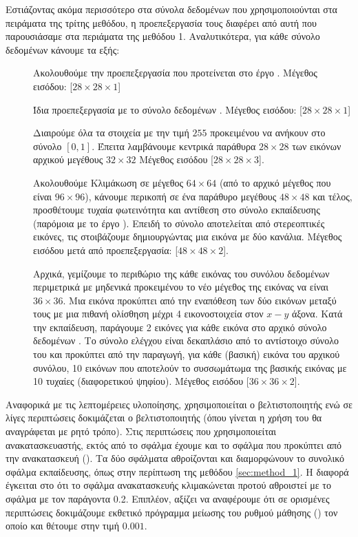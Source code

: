 Εστιάζοντας ακόμα περισσότερο στα σύνολα δεδομένων που χρησιμοποιούνται στα πειράματα της τρίτης μεθόδου, η προεπεξεργασία τους διαφέρει από αυτή που παρουσιάσαμε στα περιάματα της μεθόδου 1. Αναλυτικότερα, για κάθε σύνολο δεδομένων κάνουμε τα εξής:
\begin{description}
    \item[] Ακολουθούμε την προεπεξεργασία που προτείνεται στο έργο \cite{byerly2020branching}. Μέγεθος εισόδου: [$28 \times 28 \times 1$]
    \item[] Ίδια προεπεξεργασία με το σύνολο δεδομένων . Μέγεθος εισόδου: [$28 \times 28 \times 1$]
    \item[] Διαιρούμε όλα τα στοιχεία με την τιμή $255$ προκειμένου να ανήκουν στο σύνολο $[0,1]$. Έπειτα λαμβάνουμε κεντρικά παράθυρα $28 \times 28$ των εικόνων αρχικού μεγέθους $32 \times 32$ Μέγεθος εισόδου [$28 \times 28 \times 3$].
    \item[] Ακολουθούμε Κλιμάκωση σε μέγεθος $64 \times 64$ (από το αρχικό μέγεθος που είναι $96 \times 96$), κάνουμε περικοπή σε ένα παράθυρο μεγέθους $48 \times 48$ και τέλος, προσθέτουμε τυχαία φωτεινότητα και αντίθεση στο σύνολο εκπαίδευσης (παρόμοια με το έργο \cite{hinton2018matrix}). Επειδή το σύνολο αποτελείται από στερεοπτικές εικόνες, τις στοιβάζουμε δημιουργώντας μια εικόνα με δύο κανάλια. Μέγεθος εισόδου μετά από προεπεξεργασία: [$48 \times 48 \times 2$].
    \item[] Αρχικά, γεμίζουμε το περιθώριο της κάθε εικόνας του συνόλου δεδομένων  περιμετρικά με μηδενικά προκειμένου το νέο μέγεθος της εικόνας να είναι $36 \times 36$. Μια εικόνα  προκύπτει από την εναπόθεση των δύο εικόνων μεταξύ τους με μια πιθανή ολίσθηση μέχρι 4 εικονοστοιχεία στον $x-y$ άξονα. Κατά την εκπαίδευση, παράγουμε 2  εικόνες για κάθε εικόνα στο αρχικό σύνολο δεδομένων . Το σύνολο ελέγχου είναι δεκαπλάσιο από το αντίστοιχο σύνολο του  και προκύπτει από την παραγωγή, για κάθε (βασική) εικόνα του αρχικού συνόλου, 10 εικόνων που αποτελούν το συσσωμάτωμα της βασικής εικόνας με 10 τυχαίες (διαφορετικού ψηφίου). Μέγεθος εισόδου [$36 \times 36 \times 2$].
\end{description} 

Αναφορικά με τις λεπτομέρειες υλοποίησης, χρησιμοποιείται ο βελτιστοποιητής  ενώ σε λίγες περιπτώσεις δοκιμάζεται ο βελτιστοποιητής  (όπου γίνεται η χρήση του θα αναγράφεται με ρητό τρόπο). Στις περιπτώσεις που χρησιμοποιείται ανακατασκευαστής, εκτός από το σφάλμα  έχουμε και το σφάλμα που προκύπτει από την ανακατασκευή (). Τα δύο σφάλματα αθροίζονται και διαμορφώνουν το συνολικό σφάλμα εκπαίδευσης, όπως στην περίπτωση της μεθόδου \ref{sec:method_1}. Η διαφορά έγκειται στο ότι το σφάλμα ανακατασκευής κλιμακώνεται προτού αθροιστεί με το σφάλμα  με τον παράγοντα 0.2. Επιπλέον, αξίζει να αναφέρουμε ότι σε ορισμένες περιπτώσεις δοκιμάζουμε εκθετικό πρόγραμμα μείωσης του ρυθμού μάθησης () τον οποίο και θέτουμε στην τιμή $0.001$.\par

